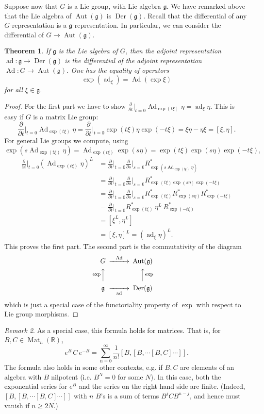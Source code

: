 \documentclass{article}
\newtheorem{theorem}{Theorem}[section]
\theoremstyle{remark}
\newtheorem{remark}[theorem]{Remark}
\newcommand{\R}{\mathbb{R}}
\newcommand\lie[1]{\mathfrak{#1}}
\newcommand{\g}{\lie{g}}
\newcommand{\on}{\operatorname}
\newcommand{\Ad}{ \on{Ad} }
\newcommand{\ad}{ \on{ad} }
\newcommand{\f}{\frac}
\newcommand{\p}{\partial}
\begin{document}
Suppose now that $G$ is a Lie group, with Lie algebra $\g$.  
We have remarked above that the Lie algebra of $\on{Aut}(\g)$ is $\on{Der}(\g)$. 
Recall that the differential of any $G$-representation is a 
$\g$-representation. In particular, we can consider the differential 
of $G\to \on{Aut}(\g)$. 
%
\begin{theorem}
If $\g$ is the Lie algebra of $G$, then the adjoint representation
$\ad\colon \g\to \on{Der}(\g)$ is the differential of the adjoint 
representation $\Ad\colon G\to \on{Aut}(\g)$. 
One has the equality of operators 
\[ \exp(\ad_\xi)=\Ad(\exp\xi)\]
for all $\xi\in\g$. 
\end{theorem}
\begin{proof}
For the first part we have to show 
$\f{\p}{\p t}\big|_{t=0}\Ad_{\exp(t\xi)}\eta=\ad_\xi\eta$. 
This is easy if $G$ is a matrix Lie group: 
\[ \f{\p}{\p t}\Big|_{t=0}\Ad_{\exp(t\xi)}\eta=\f{\p}{\p t}\Big|_{t=0}\exp(t\xi)\eta\exp(-t\xi)=\xi\eta-\eta\xi=[\xi,\eta].\]
For general Lie groups we compute, using 
\[\exp(s\Ad_{\exp(t\xi)}\eta)=\Ad_{\exp(t\xi)}\exp(s\eta)
=\exp(t\xi)\exp(s\eta)\exp(-t\xi),\]
\[ \begin{split}
\f{\p}{\p t}\Big|_{t=0} (\Ad_{\exp(t\xi)}\eta)^L
&=\f{\p}{\p t}\Big|_{t=0} \f{\p}{\p s}\Big|_{s=0}
R_{\exp(s\Ad_{\exp(t\xi)}\eta)}^*
\\
&=\f{\p}{\p t}\Big|_{t=0} \f{\p}{\p s}\Big|_{s=0}
R_{\exp(t\xi)\exp(s\eta)\exp(-t\xi)}^*\\
&=\f{\p}{\p t}\Big|_{t=0} \f{\p}{\p s}\Big|_{s=0}
R_{\exp(t\xi)}^*R_{\exp(s\eta)}^*R_{\exp(-t\xi)}^*\\
&=\f{\p}{\p t}\Big|_{t=0} R_{\exp(t\xi)}^*\ \eta^L\ R_{\exp(-t\xi)}^*\\
&=[\xi^L,\eta^L]\\
&=[\xi,\eta]^L=(\ad_\xi\eta)^L. 
\end{split}\] 
This proves the first part. The second part is the commutativity of the diagram
\[ \begin{CD} G @>{\on{Ad}}>> \on{Aut}(\g) \\
@A{\exp}AA @AA{\exp}A \\
\g @>>{\on{ad}}> \on{Der}(\g)
\end{CD}\]
%
which is just a special case of the functoriality property of $\exp$
with respect to Lie group morphisms.   
\end{proof}

\begin{remark}
As a special case, this formula holds for matrices. That is, for 
$B,C\in \on{Mat}_n(\R)$, 
\[ e^B\, C\, e^{-B}=\sum_{n=0}^\infty \f{1}{n!} [B,[B,\cdots [B,C]\cdots]].\]
The formula also holds in some other contexts, e.g. if $B,C$ are elements 
of an algebra with $B$ nilpotent (i.e. $B^N=0$ for some $N$). In this case, both the exponential series for 
$e^B$ and the series on the right hand side are finite. (Indeed, $[B,[B,\cdots [B,C]\cdots]]$ with $n$ $B$'s is a 
sum of terms $B^j C B^{n-j}$, and hence must vanish if $n\ge 2N$.)  
\end{remark}
\end{document}
